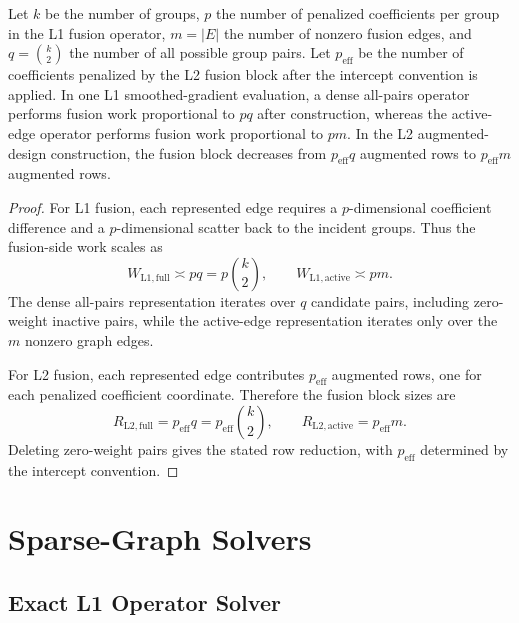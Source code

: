 \documentclass[twoside,11pt]{article}
\begin{document}
\begin{proposition}
\label{prop:complexity}
\leavevmode\par\noindent
Let $k$ be the number of groups, $p$ the number of penalized coefficients per
group in the L1 fusion operator, $m=|E|$ the number of nonzero fusion edges,
and $q=\binom{k}{2}$ the number of all possible group pairs. Let
$p_{\mathrm{eff}}$ be the number of coefficients penalized by the L2 fusion
block after the intercept convention is applied. In one L1 smoothed-gradient
evaluation, a dense all-pairs operator performs fusion work proportional to
$pq$ after construction, whereas the active-edge operator performs fusion work
proportional to $pm$. In the L2 augmented-design construction, the fusion
block decreases from $p_{\mathrm{eff}}q$ augmented rows to
$p_{\mathrm{eff}}m$ augmented rows.
\end{proposition}

\begin{proof}
For L1 fusion, each represented edge requires a $p$-dimensional coefficient
difference and a $p$-dimensional scatter back to the incident groups. Thus the
fusion-side work scales as
\[
  W_{\mathrm{L1,full}} \asymp p q
  =
  p\binom{k}{2},
  \qquad
  W_{\mathrm{L1,active}} \asymp p m .
\]
The dense all-pairs representation iterates over $q$ candidate pairs,
including zero-weight inactive pairs, while the active-edge representation
iterates only over the $m$ nonzero graph edges.

For L2 fusion, each represented edge contributes $p_{\mathrm{eff}}$ augmented
rows, one for each penalized coefficient coordinate. Therefore the fusion
block sizes are
\[
  R_{\mathrm{L2,full}} = p_{\mathrm{eff}} q
  =
  p_{\mathrm{eff}}\binom{k}{2},
  \qquad
  R_{\mathrm{L2,active}} = p_{\mathrm{eff}} m .
\]
Deleting zero-weight pairs gives the stated row reduction, with
$p_{\mathrm{eff}}$ determined by the intercept convention.
\end{proof}

\section{Sparse-Graph Solvers}
\label{sec:solvers}

\subsection{Exact L1 Operator Solver}
\end{document}
